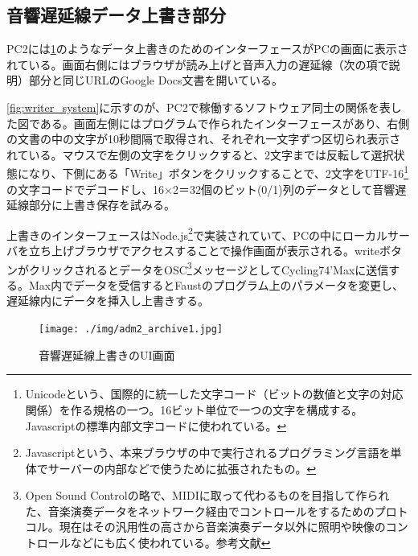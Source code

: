 \documentclass[a4paper,report]{jsbook}
\begin{document}
\subsection{音響遅延線データ上書き部分}\label{ux97f3ux97ffux9045ux5ef6ux7ddaux30c7ux30fcux30bfux4e0aux66f8ux304dux90e8ux5206}

PC2には\cref{fig:adm_writer}のようなデータ上書きのためのインターフェースがPCの画面に表示されている。画面右側にはブラウザが読み上げと音声入力の遅延線（次の項で説明）部分と同じURLのGoogle
Docs文書を開いている。

\cref{fig:writer_system}に示すのが、PC2で稼働するソフトウェア同士の関係を表した図である。画面左側にはプログラムで作られたインターフェースがあり、右側の文書の中の文字が10秒間隔で取得され、それぞれ一文字ずつ区切られ表示されている。マウスで左側の文字をクリックすると、2文字までは反転して選択状態になり、下側にある「Write」ボタンをクリックすることで、2文字をUTF-16\footnote{Unicodeという、国際的に統一した文字コード（ビットの数値と文字の対応関係）を作る規格の一つ。16ビット単位で一つの文字を構成する。Javascriptの標準内部文字コードに使われている。}の文字コードでデコードし、16×2＝32個のビット(0/1)列のデータとして音響遅延線部分に上書き保存を試みる。

上書きのインターフェースはNode.js\footnote{Javascriptという、本来ブラウザの中で実行されるプログラミング言語を単体でサーバーの内部などで使うために拡張されたもの。}で実装されていて、PCの中にローカルサーバを立ち上げブラウザでアクセスすることで操作画面が表示される。writeボタンがクリックされるとデータをOSC\footnote{Open
  Sound
  Controlの略で、MIDIに取って代わるものを目指して作られた、音楽演奏データをネットワーク経由でコントロールをするためのプロトコル。現在はその汎用性の高さから音楽演奏データ以外に照明や映像のコントロールなどにも広く使われている。参考文献\autocite{wright2003opensound}}メッセージとしてCycling74'Maxに送信する。Max内でデータを受信するとFaustのプログラム上のパラメータを変更し、遅延線内にデータを挿入し上書きする。

\begin{figure}[htbp]
\centering
\texttt{[image: ./img/adm2\_archive1.jpg]}
\caption{音響遅延線上書きのUI画面\label{fig:adm_writer}}
\end{figure}
\end{document}
